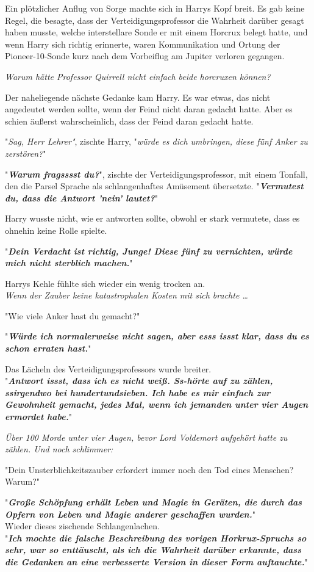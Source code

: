 {Ein plötzlicher Anflug von Sorge machte sich in Harrys Kopf breit. Es gab keine Regel, die besagte, dass der Verteidigungsprofessor die Wahrheit darüber gesagt haben musste, welche interstellare Sonde er mit einem Horcrux belegt hatte, und wenn Harry sich richtig erinnerte, waren Kommunikation und Ortung der Pioneer-10-Sonde kurz nach dem Vorbeiflug am Jupiter verloren gegangen.

\emph{Warum hätte Professor Quirrell nicht einfach beide horcruxen können?}

Der naheliegende nächste Gedanke kam Harry. Es war etwas, das nicht angedeutet werden sollte, wenn der Feind nicht daran gedacht hatte. Aber es schien äußerst wahrscheinlich, dass der Feind daran gedacht hatte.

"\emph{Sag, Herr Lehrer"}, zischte Harry, "\emph{würde es dich umbringen, diese fünf Anker zu zerstören?}"

"\textbf{\emph{Warum fragsssst du?}}", zischte der Verteidigungsprofessor, mit einem Tonfall, den die Parsel Sprache als schlangenhaftes Amüsement übersetzte. "\textbf{\emph{Vermutest du, dass die Antwort 'nein' lautet?}}"

Harry wusste nicht, wie er antworten sollte, obwohl er stark vermutete, dass es ohnehin keine Rolle spielte.

"\textbf{\emph{Dein Verdacht ist richtig, Junge! Diese fünf zu vernichten, würde mich nicht sterblich machen.}}"

Harrys Kehle fühlte sich wieder ein wenig trocken an.\\ \emph{Wenn der Zauber keine katastrophalen Kosten mit sich brachte …}

"Wie viele Anker hast du gemacht?"

"\textbf{\emph{Würde ich normalerweise nicht sagen, aber esss issst klar, dass du es schon erraten hast.}}"

Das Lächeln des Verteidigungsprofessors wurde breiter.\\ "\textbf{\emph{Antwort issst, dass ich es nicht weiß. Ss-hörte auf zu zählen, ssirgendwo bei hundertundsieben. Ich habe es mir einfach zur Gewohnheit gemacht, jedes Mal, wenn ich jemanden unter vier Augen ermordet habe.}}"

\emph{Über 100 Morde unter vier Augen, bevor Lord Voldemort aufgehört hatte zu zählen. Und noch schlimmer:}

"Dein Unsterblichkeitszauber erfordert immer noch den Tod eines Menschen? Warum?"

"\textbf{\emph{Große Schöpfung erhält Leben und Magie in Geräten, die durch das Opfern von Leben und Magie anderer geschaffen wurden.}}"\\ Wieder dieses zischende Schlangenlachen.\\ "\textbf{\emph{Ich mochte die falsche Beschreibung des vorigen Horkrux-Spruchs so sehr, war so enttäuscht, als ich die Wahrheit darüber erkannte, dass die Gedanken an eine verbesserte Version in dieser Form auftauchte.}}"

}
